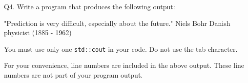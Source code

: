 Q4. Write a program that produces the following output:
\begin{console}[numbers=left]
"Prediction is very difficult, 
especially about the future."
    Niels Bohr
    Danish physicist (1885 - 1962)

\end{console}
You must use only one 
\verb!std::cout! in your code. 
Do not use the tab character. 

For your convenience, line numbers are included in the above output.
These line numbers are not part of your program output.

